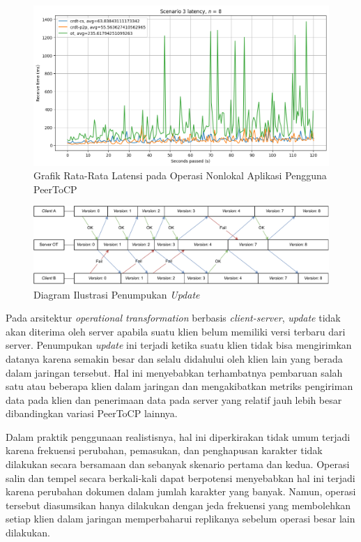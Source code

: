\begin{figure}
 \centering
 \includegraphics[width=15cm]{./assets/skripsi/benchmark-vis_cell_7_output_5}
 \caption{Grafik Rata-Rata Latensi pada Operasi Nonlokal Aplikasi Pengguna PeerToCP}
 \label{fig:7-5}
\end{figure}

\begin{figure}
 \centering
 \includegraphics[width=15cm]{./assets/skripsi/Snowball}
 \caption{Diagram Ilustrasi Penumpukan \textit{Update}}
 \label{diagram:snowball}
\end{figure}

Pada arsitektur \textit{operational transformation} berbasis \textit{client-server}, \textit{update} tidak akan diterima oleh server apabila suatu klien belum memiliki versi terbaru dari server. Penumpukan \textit{update} ini terjadi ketika suatu klien tidak bisa mengirimkan datanya karena semakin besar dan selalu didahului oleh klien lain yang berada dalam jaringan tersebut. Hal ini menyebabkan terhambatnya pembaruan salah satu atau beberapa klien dalam jaringan dan mengakibatkan metriks pengiriman data pada klien dan penerimaan data pada server yang relatif jauh lebih besar dibandingkan variasi PeerToCP lainnya.

Dalam praktik penggunaan realistisnya, hal ini diperkirakan tidak umum terjadi karena frekuensi perubahan, pemasukan, dan penghapusan karakter tidak dilakukan secara bersamaan dan sebanyak skenario pertama dan kedua. Operasi salin dan tempel secara berkali-kali dapat berpotensi menyebabkan hal ini terjadi karena perubahan dokumen dalam jumlah karakter yang banyak. Namun, operasi tersebut diasumsikan hanya dilakukan dengan jeda frekuensi yang membolehkan setiap klien dalam jaringan memperbaharui replikanya sebelum operasi besar lain dilakukan.


